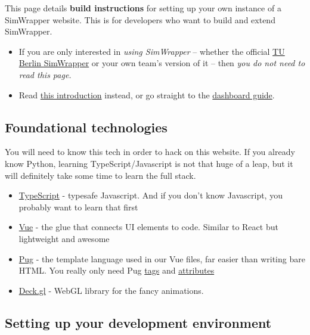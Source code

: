 This page details \textbf{build instructions} for setting up your own
instance of a SimWrapper website. This is for developers who want to
build and extend SimWrapper.

\begin{itemize}
\tightlist
\item
  If you are only interested in \emph{using SimWrapper} -- whether the
  official \href{https://vsp.berlin/simwrapper}{TU Berlin SimWrapper} or
  your own team's version of it -- then \emph{you do not need to read
  this page.}
\item
  Read \href{index.md}{this introduction} instead, or go straight to the
  \href{guide-dashboards.md}{dashboard guide}.
\end{itemize}

\hypertarget{foundational-technologies}{%
\subsection{Foundational technologies}\label{foundational-technologies}}

You will need to know this tech in order to hack on this website. If you
already know Python, learning TypeScript/Javascript is not that huge of
a leap, but it will definitely take some time to learn the full stack.

\begin{itemize}
\tightlist
\item
  \href{https://typescriptlang.org}{TypeScript} - typesafe Javascript.
  And if you don't know Javascript, you probably want to learn that
  first
\item
  \href{https://vuejs.org}{Vue} - the glue that connects UI elements to
  code. Similar to React but lightweight and awesome
\item
  \href{https://pugjs.org/}{Pug} - the template language used in our Vue
  files, far easier than writing bare HTML. You really only need Pug
  \href{https://pugjs.org/language/tags.html}{tags} and
  \href{https://pugjs.org/language/attributes.html}{attributes}
\item
  \href{https://deck.gl}{Deck.gl} - WebGL library for the fancy
  animations.
\end{itemize}

\hypertarget{setting-up-your-development-environment}{%
\subsection{Setting up your development
environment}\label{setting-up-your-development-environment}}


